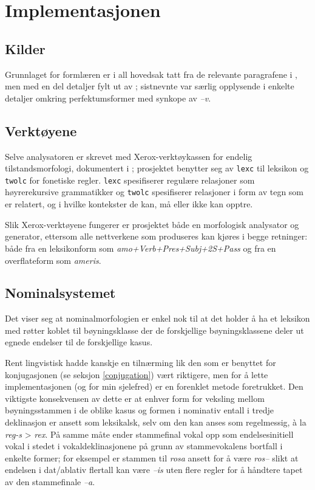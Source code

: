 \documentclass{article}
\begin{document}
\section{Implementasjonen}
\subsection{Kilder} %
Grunnlaget for forml\ae{}ren er i all hovedsak tatt fra de relevante
paragrafene i , men med en del detaljer fylt ut av
; sistnevnte var s\ae{}rlig opplysende i enkelte detaljer
omkring perfektumsformer med synkope av \emph{--v}.

\subsection{Verkt\o{}yene}
Selve analysatoren er skrevet med Xerox-verkt\o{}ykassen for endelig
tilstandsmorfologi, dokumentert i ; prosjektet benytter seg av
\texttt{lexc} til leksikon og \texttt{twolc} for fonetiske regler.
\texttt{lexc} spesifiserer regul\ae{}re relasjoner som h\o{}yrerekursive
grammatikker og \texttt{twolc} spesifiserer relasjoner i form av tegn som er
relatert, og i hvilke kontekster de kan, m\aa{} eller ikke kan opptre.

Slik Xerox-verkt\o{}yene fungerer er prosjektet b\aa{}de en morfologisk
analysator og generator, ettersom alle nettverkene som produseres kan
kj\o{}res i begge retninger: b\aa{}de fra en leksikonform som
\emph{amo+Verb+Pres+Subj+2S+Pass} og fra en overflateform som \emph{ameris}.

\subsection{Nominalsystemet}
Det viser seg at nominalmorfologien er enkel nok til at det holder \aa{} ha et
leksikon med r\o{}tter koblet til b\o{}yningsklasse der de forskjellige
b\o{}yningsklassene deler ut egnede endelser til de forskjellige kasus.

Rent lingvistisk hadde kanskje en tiln\ae{}rming lik den som er benyttet for
konjugasjonen (se seksjon \ref{conjugation}) v\ae{}rt riktigere, men for \aa{}
lette implementasjonen (og for min sjelefred) er en forenklet metode
foretrukket. Den viktigste konsekvensen av dette er at enhver form for
veksling mellom b\o{}yningsstammen i de oblike kasus og formen i nominativ
entall i tredje deklinasjon er ansett som leksikalsk, selv om den kan anses
som regelmessig, \`a la \emph{reg-s} > \emph{rex}. P\aa{} samme m\aa{}te ender
stammefinal vokal opp som endelsesinitiell vokal i stedet i
vokaldeklinasjonene p\aa{} grunn av stammevokalens bortfall i enkelte former;
for eksempel er stammen til \emph{rosa} ansett for \aa{} v\ae{}re \emph{ros--}
slikt at endelsen i dat/ablativ flertall kan v\ae{}re \emph{--is} uten flere
regler for \aa{} h\aa{}ndtere tapet av den stammefinale \emph{--a}.
\end{document}
